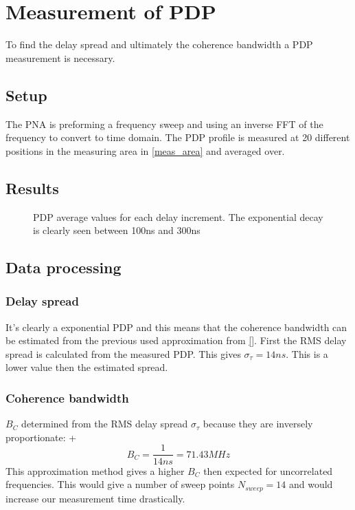 \chapter{Measurement of PDP}
To find the delay spread and ultimately the coherence bandwidth a \gls{PDP} measurement is necessary. 
\section{Setup}
The PNA is preforming a frequency sweep and using an inverse FFT of the frequency to convert to time domain.
The PDP profile is measured at 20 different positions in the measuring area in \autoref{meas_area} and averaged over. 
\section{Results}

\begin{figure}[H]
\centering

\caption{PDP average values for each delay increment. The exponential decay is clearly seen between 100ns and 300ns}

\label{fig:SNRMeas}
\end{figure}
\section{Data processing}

\subsection{Delay spread}
It's clearly a exponential PDP and this means that the coherence bandwidth can be estimated from the previous used approximation from \autoref{}. First the RMS delay spread is calculated from the measured PDP. This gives $\sigma_{\tau} = 14ns$. This is a lower value then the estimated spread.
\subsection{Coherence bandwidth}\label{sec:coherence_bandwidth}
$B_C$ determined from the RMS delay spread $\sigma_{\tau}$ because they are inversely proportionate:
+\begin{equation}
B_C = \frac{1}{14ns} = 71.43 MHz 
\end{equation}
This approximation method gives a higher $B_C$ then expected for uncorrelated frequencies. This would give a number of sweep points $N_{sweep} = 14$ and would increase our measurement time drastically.

